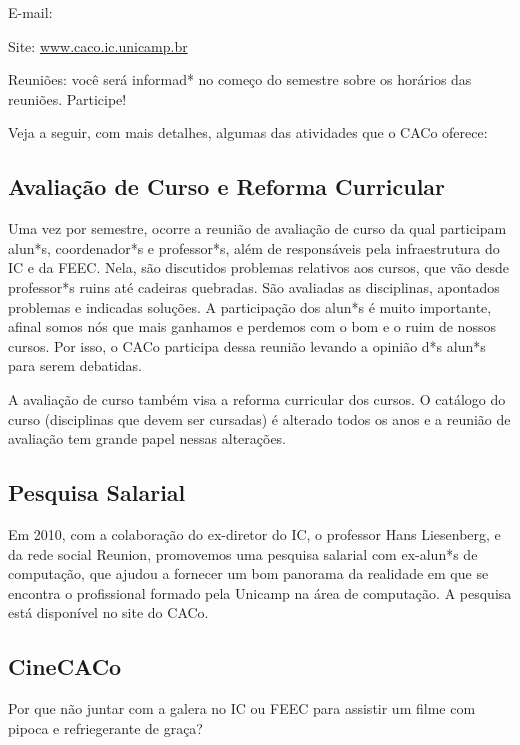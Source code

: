 \begin{compactitemize}
    \item  E-mail: 
    \item  Site: \url{www.caco.ic.unicamp.br}
    \item  Reuniões: você será informad* no começo do semestre sobre os
    horários das reuniões. Participe!
\end{compactitemize}

Veja a seguir, com mais detalhes, algumas das atividades que o CACo oferece:

\subsection{Avaliação de Curso e Reforma Curricular}

Uma vez por semestre, ocorre a reunião de avaliação de curso da qual participam
alun*s, coordenador*s e professor*s, além de responsáveis pela infraestrutura
do IC e da FEEC. Nela, são discutidos problemas relativos aos cursos, que vão
desde professor*s ruins até cadeiras quebradas. São avaliadas as disciplinas,
apontados problemas e indicadas soluções. A participação dos alun*s é muito
importante, afinal somos nós que mais ganhamos e perdemos com o bom e o ruim de
nossos cursos. Por isso, o CACo participa dessa reunião levando a opinião d*s
alun*s para serem debatidas.

A avaliação de curso também visa a reforma curricular dos cursos. O catálogo do
curso (disciplinas que devem ser cursadas) é alterado todos os anos e a reunião
de avaliação tem grande papel nessas alterações.

\subsection{Pesquisa Salarial}

Em 2010, com a colaboração do ex-diretor do IC, o professor Hans Liesenberg, e
da rede social Reunion, promovemos uma pesquisa salarial com ex-alun*s de
computação, que ajudou a fornecer um bom panorama da realidade em que se
encontra o profissional formado pela Unicamp na área de computação. A pesquisa
está disponível no site do CACo.

\subsection{CineCACo}

Por que não juntar com a galera no IC ou FEEC para assistir um filme com pipoca
e refriegerante de graça?

